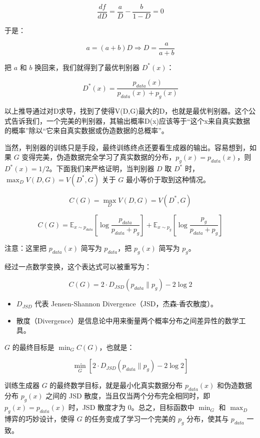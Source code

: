 \[
\frac{df}{dD}=\frac{a}{D}-\frac{b}{1-D}=0
\]

于是：

\[
a=(a+b)D \Rightarrow D=\frac{a}{a+b}
\]

把 \(a\) 和 \(b\) 换回来，我们就得到了最优判别器 \(D^*(x)\)：

\[
D^*(x)=\frac{p_{data}(x)}{p_{data}(x)+p_g(x)}
\]

以上推导通过对D求导，找到了使得V(D,G)最大的D，也就是最优判别器。这个公式告诉我们，一个完美的判别器，其输出概率D(x)应该等于``这个x来自真实数据的概率''除以``它来自真实数据或伪造数据的总概率''。

当然，判别器的训练只是手段，最终训练终点还要看生成器的输出。容易想到，如果 \(G\) 变得完美，伪造数据完全学习了真实数据的分布，\(p_g(x)=p_{data}(x)\)，则 \(D^*(x)=1/2\)。下面我们来严格证明，当判别器 \(D\) 取 \(D^*\) 时，\(\max_D V(D,G)=V(D^*,G)\) 关于 \(G\) 最小等价于取到这种情况。

\[
C(G)=\max_D V(D,G)=V(D^*,G)
\]

\[
C(G)=\mathbb{E}_{x\sim p_{data}}\left[\log\frac{p_{data}}{p_{data}+p_g}\right]
+\mathbb{E}_{x\sim p_g}\left[\log\frac{p_g}{p_{data}+p_g}\right]
\]

注意：这里把 \(p_{data}(x)\) 简写为 \(p_{data}\)，把 \(p_g(x)\) 简写为 \(p_g\)。

经过一点数学变换，这个表达式可以被重写为：

\[
C(G)=2\cdot D_{JSD}(p_{data}\parallel p_g)-2\log 2
\]

\begin{itemize}
\tightlist
\item
  \(D_{JSD}\) 代表 Jensen-Shannon Divergence（JSD，杰森-香农散度）。
\item
  散度（Divergence）是信息论中用来衡量两个概率分布之间差异性的数学工具。
\end{itemize}

\(G\) 的最终目标是 \(\min_G C(G)\)，也就是：

\[
\min_G [2\cdot D_{JSD}(p_{data}\parallel p_g)-2\log 2]
\]

训练生成器 \(G\) 的最终数学目标，就是最小化真实数据分布 \(p_{data}(x)\) 和伪造数据分布 \(p_g(x)\) 之间的 JSD 散度，当且仅当两个分布完全相同时，即 \(p_g(x)=p_{data}(x)\) 时，JSD 散度才为 \(0\)。总之，目标函数中 \(\min_G\) 和 \(\max_D\) 博弈的巧妙设计，使得 \(G\) 的任务变成了学习一个完美的 \(p_g\) 分布，使其与 \(p_{data}\) 一致。

